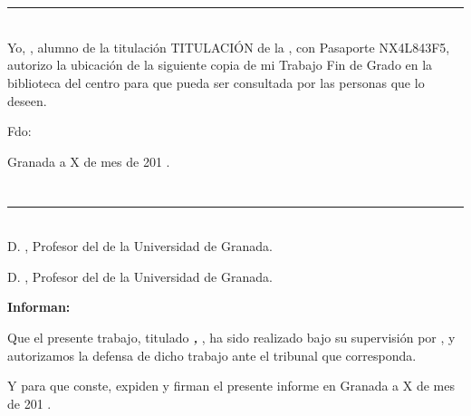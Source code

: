 \chapter*{}
\thispagestyle{empty}

\noindent\rule[-1ex]{\textwidth}{2pt}\\[4.5ex]

Yo, \textbf{\myName}, alumno de la titulación TITULACIÓN de la \textbf{\myFaculty}, 
con Pasaporte NX4L843F5, autorizo la ubicación de la siguiente copia de mi 
Trabajo Fin de Grado en la biblioteca del centro para que pueda ser
consultada por las personas que lo deseen.

\vspace{6cm}

\noindent Fdo: \myName

\vspace{2cm}

\begin{flushright}
Granada a X de mes de 201 .
\end{flushright}


\chapter*{}
\thispagestyle{empty}

\noindent\rule[-1ex]{\textwidth}{2pt}\\[4.5ex]

D. \textbf{\myProf}, Profesor del \myDepartment de la Universidad de Granada.

\vspace{0.5cm}

D. \textbf{\myOtherProf}, Profesor del \myDepartment de la Universidad de Granada.


\vspace{0.5cm}

\textbf{Informan:}

\vspace{0.5cm}

Que el presente trabajo, titulado \textit{\textbf{\myTitle, \mySubTitle}},
ha sido realizado bajo su supervisión por \textbf{\myName}, y autorizamos la defensa de dicho trabajo ante el tribunal
que corresponda.

\vspace{0.5cm}

Y para que conste, expiden y firman el presente informe en Granada a X de mes de 201 .

\vspace{1cm}

